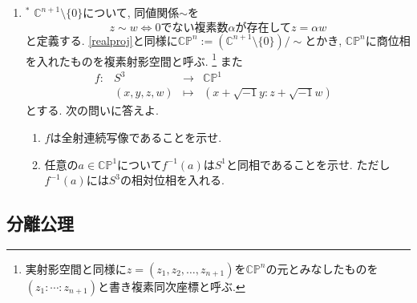 \documentclass[dvipdfmx,a4paper,11pt]{article}
\newcommand{\C}{\mathbb{C}}
\theoremstyle{definition}
\begin{document}
\begin{enumerate}[ label=\textbf{問}\ref*{sec-quot}.\arabic*]
\item $^{*}$ \label{cpxproj}$\C^{n+1} \setminus \{ 0\}$について, 同値関係$\sim$を
	$$
	z \sim w \Leftrightarrow \text{0でない複素数$\alpha$が存在して$z = \alpha w$}
	$$
	と定義する. \ref{realproj}と同様に$ \C\mathbb{P}^{n}:= (\C^{n+1} \setminus \{ 0\})/\sim$とかき, $ \C\mathbb{P}^{n}$に商位相を入れたものを複素射影空間と呼ぶ. \footnote{実射影空間と同様に$z = (z_{1}, z_{2}, \ldots, z_{n+1})$を$\C\mathbb{P}^{n}$の元とみなしたものを$(z_{1}: \cdots : z_{n+1})$と書き複素同次座標と呼ぶ. }
	また
$$
\begin{array}{ccccc}
f :&S^{3}& \rightarrow & \C\mathbb{P}^{1}& \\
&(x,y,z,w) & \longmapsto & 
(x + \sqrt{-1}y: z + \sqrt{-1}w)&
\end{array}
$$
とする. 次の問いに答えよ.
\begin{enumerate}
	\setlength{\parskip}{0cm} 
  \setlength{\itemsep}{0pt} 
\item $f$は全射連続写像であることを示せ. 
\item 任意の$a \in \C\mathbb{P}^{1}$について$f^{-1}(a)$は$S^1$と同相であることを示せ. ただし$f^{-1}(a)$には$S^3$の相対位相を入れる.
\end{enumerate}


	

	
 \end{enumerate}


\newpage






\begin{center}
\section{分離公理}
\label{sec-Hausdorff}
\end{center}
\end{document}

